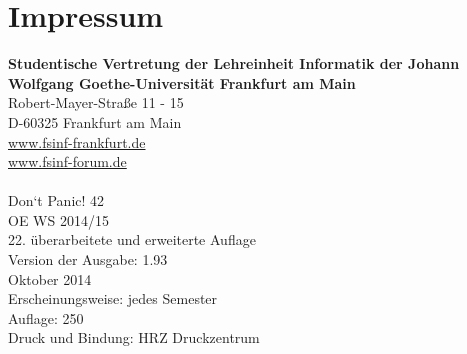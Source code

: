 \section{Impressum}
\spaltenanfang
\textbf{Studentische Vertretung der Lehreinheit Informatik der Johann Wolfgang Goethe-Universität Frankfurt am Main}\\
Robert-Mayer-Straße 11 - 15\\
D-60325 Frankfurt am Main\\
\url{www.fsinf-frankfurt.de}\\
\url{www.fsinf-forum.de}\\
\emailfachschaft\\
Don‘t Panic! 42\\
OE WS 2014/15\\
22. überarbeitete und erweiterte Auflage\\
Version der Ausgabe: 1.93\\
Oktober 2014\\
Erscheinungsweise: jedes Semester\\
Auflage: 250\\
Druck und Bindung: HRZ Druckzentrum

\spaltenende
